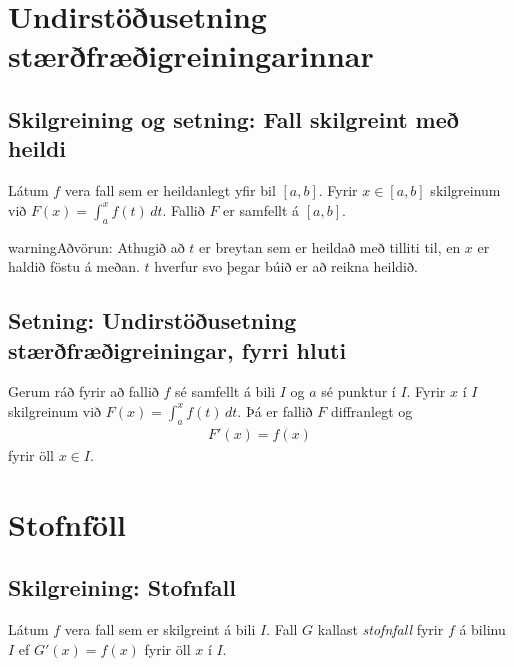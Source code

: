 \documentclass[a4paper,10pt,icelandic]{sphinxmanual}
\begin{document}
\section{Undirstöðusetning stærðfræðigreiningarinnar}
\label{kafli06:undirstousetning-staerfraeigreiningarinnar}

\subsection{Skilgreining og setning: Fall skilgreint með heildi}
\label{kafli06:index-5}\label{kafli06:skilgreining-og-setning-fall-skilgreint-me-heildi}
Látum \(f\) vera fall sem er heildanlegt yfir bil \([a, b]\).
Fyrir \(x\in[a, b]\) skilgreinum við \(F(x)=\int_a^x f(t)\,dt\).
Fallið \(F\) er samfellt á \([a, b]\).

\begin{notice}{warning}{Aðvörun:}
Athugið að \(t\) er breytan sem er heildað með tilliti til, en
\(x\) er haldið föstu á meðan. \(t\) hverfur svo þegar búið er
að reikna heildið.
\end{notice}


\subsection{Setning: Undirstöðusetning stærðfræðigreiningar, fyrri hluti}
\label{kafli06:undirstodusetning-fyrri}\label{kafli06:index-6}\label{kafli06:setning-undirstousetning-staerfraeigreiningar-fyrri-hluti}
Gerum ráð fyrir að fallið \(f\) sé samfellt á bili \(I\) og
\(a\) sé punktur í \(I\). Fyrir \(x\) í \(I\)
skilgreinum við \(F(x)=\int_a^x f(t)\,dt\). Þá er fallið \(F\)
diffranlegt og
\begin{equation*}
\begin{split}F'(x)=f(x)\end{split}
\end{equation*}
fyrir öll \(x\in I\).


\section{Stofnföll}
\label{kafli06:stofnfoll}\label{kafli06:index-7}

\subsection{Skilgreining: Stofnfall}
\label{kafli06:skilgreining-stofnfall}
Látum \(f\) vera fall sem er skilgreint á bili \(I\). Fall
\(G\) kallast \textit{stofnfall} fyrir \(f\) á
bilinu \(I\) ef \(G'(x)=f(x)\) fyrir öll \(x\) í \(I\).
\end{document}
